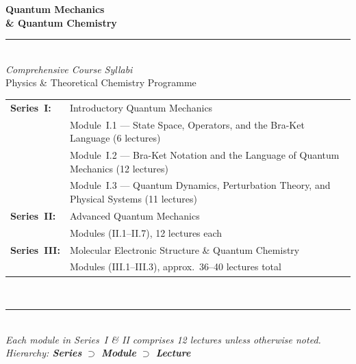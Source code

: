 \documentclass[11pt,a4paper]{article}
\begin{document}

\begin{titlepage}
\pagecolor{darkblue}
\color{white}
\vspace*{3cm}
\begin{center}
  {\fontsize{28}{34}\selectfont\bfseries Quantum Mechanics}\\[0.4cm]
  {\fontsize{18}{24}\selectfont\bfseries \& Quantum Chemistry}\\[0.6cm]
  {\color{accentgold}\rule{10cm}{2pt}}\\[0.6cm]
  {\large\itshape Comprehensive Course Syllabi}\\[0.3cm]
  {\normalsize Physics \& Theoretical Chemistry Programme}\\[2.5cm]
  \begin{tabular}{ll}
    \textbf{Series~I:}   & Introductory Quantum Mechanics\\
                         & \quad Module~I.1 --- State Space, Operators, and the Bra-Ket Language (6 lectures)\\
                         & \quad Module~I.2 --- Bra-Ket Notation and the Language of Quantum Mechanics (12 lectures)\\
                         & \quad Module~I.3 --- Quantum Dynamics, Perturbation Theory, and Physical Systems (11 lectures)\\[6pt]
    \textbf{Series~II:}  & Advanced Quantum Mechanics\\
                         & \quad 7 Modules (II.1--II.7), 12 lectures each\\[6pt]
    \textbf{Series~III:} & Molecular Electronic Structure \& Quantum Chemistry\\
                         & \quad 3 Modules (III.1--III.3), approx.\ 36--40 lectures total\\
  \end{tabular}\\[2.5cm]
  {\color{accentgold}\rule{10cm}{1pt}}\\[0.4cm]
  {\small\itshape Each module in Series~I \& II comprises 12 lectures unless otherwise noted.\\
  Hierarchy: \textbf{Series} $\supset$ \textbf{Module} $\supset$ \textbf{Lecture}}
\end{center}
\vfill
\end{titlepage}
\nopagecolor

\tableofcontents
\newpage
\end{document}
